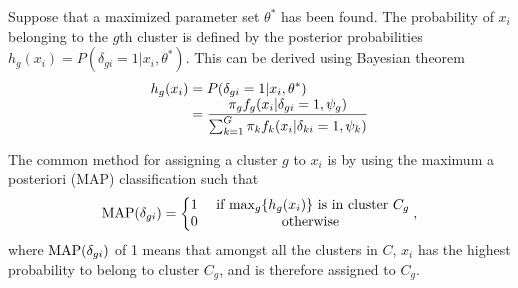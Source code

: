 Suppose that a maximized parameter set \(\theta^*\) has been found. The probability of \(x_i\) belonging to the \(g\)th cluster is defined by the posterior probabilities \(h_g(x_i)=P(\delta_{gi}=1|x_i,\theta^*)\). This can be derived using Bayesian theorem 
\begin{equation}
    \begin{array}{l@{} >{\displaystyle}l}
    h_g(x_i)\;& = P(\delta_{gi}=1|x_i,\theta^*) \\ 
            & = \frac{\pi_gf_g(x_i|\delta_{gi}=1,\psi_g)}{\sum_{k=1}^{G}\pi_kf_k(x_i|\delta_{ki}=1,\psi_k)}\\ 
    \end{array}
\end{equation}

The common method for assigning a cluster \(g\) to \(x_i\) is by using the maximum a posteriori (MAP) classification such that 
\begin{equation}
    \textup{MAP}(\delta_{gi}) = \left\{
        \begin{matrix}
            1 & \textup{ if } \textup{max}_g\{h_g(x_i)\} \textup{ is in cluster } C_g \\ 
            0 & \textup{ otherwise }
        \end{matrix}\right. ,
\end{equation}
\noindent
where \(\textup{MAP}(\delta_{gi})\) of 1 means that amongst all the clusters in \(C\), \(x_i\) has the highest probability to belong to cluster \(C_g\), and is therefore assigned to \(C_g\).

